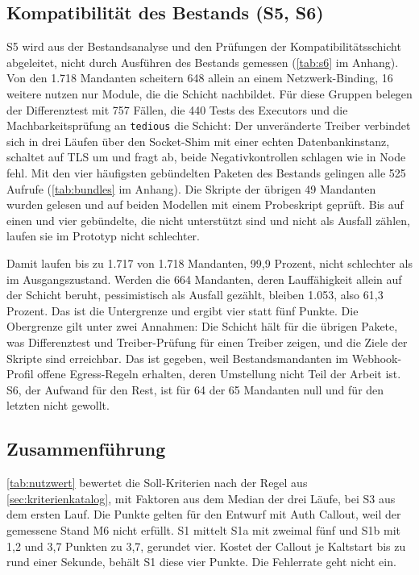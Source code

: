 \subsection{Kompatibilität des Bestands (S5, S6)}
\label{sec:pruefung-kompatibilitaet}

S5 wird aus der Bestandsanalyse und den Prüfungen der Kompatibilitätsschicht abgeleitet, nicht durch Ausführen des
Bestands gemessen (\autoref{tab:s6} im Anhang). Von den 1.718 Mandanten scheitern 648 allein an einem
Netzwerk-Binding, 16 weitere nutzen nur Module, die die Schicht nachbildet. Für diese Gruppen belegen der Differenztest
mit 757 Fällen, die 440 Tests des Executors und die Machbarkeitsprüfung an \texttt{tedious} die Schicht: Der unveränderte
Treiber verbindet sich in drei Läufen über den Socket-Shim mit einer echten Datenbankinstanz, schaltet auf \ac{TLS} um und
fragt ab, beide Negativkontrollen schlagen wie in Node fehl. Mit den vier häufigsten gebündelten Paketen des Bestands
gelingen alle 525 Aufrufe (\autoref{tab:bundles} im Anhang). Die Skripte der übrigen 49 Mandanten wurden gelesen und auf
beiden Modellen mit einem Probeskript geprüft. Bis auf einen und vier gebündelte, die nicht unterstützt sind und nicht
als Ausfall zählen, laufen sie im Prototyp nicht schlechter.

Damit laufen bis zu 1.717 von 1.718 Mandanten, 99,9 Prozent, nicht schlechter als im Ausgangszustand. Werden die 664
Mandanten, deren Lauffähigkeit allein auf der Schicht beruht, pessimistisch als Ausfall gezählt, bleiben 1.053, also 61,3
Prozent. Das ist die Untergrenze und ergibt vier statt fünf Punkte. Die Obergrenze gilt unter zwei Annahmen: Die Schicht
hält für die übrigen Pakete, was Differenztest und Treiber-Prüfung für einen Treiber zeigen, und die Ziele der Skripte
sind erreichbar. Das ist gegeben, weil Bestandsmandanten im Webhook-Profil offene Egress-Regeln erhalten, deren Umstellung nicht Teil der Arbeit ist. S6, der
Aufwand für den Rest, ist für 64 der 65 Mandanten null und für den letzten
nicht gewollt.

\subsection{Zusammenführung}
\label{sec:nutzwert}

\autoref{tab:nutzwert} bewertet die Soll-Kriterien nach der Regel aus \autoref{sec:kriterienkatalog}, mit Faktoren aus
dem Median der drei Läufe, bei S3 aus dem ersten Lauf. Die Punkte gelten für den Entwurf mit Auth Callout, weil der gemessene Stand M6 nicht erfüllt.
S1 mittelt S1a mit zweimal fünf und S1b mit 1,2 und 3,7 Punkten zu 3,7, gerundet vier. Kostet der Callout je
Kaltstart bis zu rund einer Sekunde, behält S1 diese vier Punkte. Die Fehlerrate geht nicht ein.

